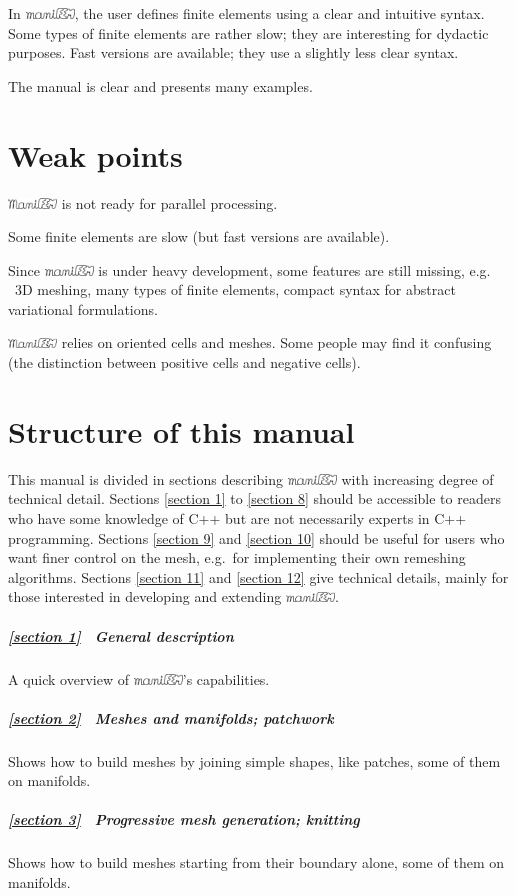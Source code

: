 \documentclass[a4paper]{scrreprt}
\def\numb{}
\newcommand\ManiFEM{\leavevmode\hbox{\includegraphics[width=13mm]{manifem-large}}}
\newcommand\maniFEM{\leavevmode\hbox{\includegraphics[width=13mm]{manifem-small}}}
\renewcommand\tt{\normalfont\ttfamily}
\begin{document}
In {\maniFEM}, the user defines finite elements using a clear and intuitive syntax.
Some types of finite elements are rather slow; they are interesting for dydactic purposes.
Fast versions are available; they use a slightly less clear syntax.

The manual is clear and presents many examples.


\section*{Weak points}

{\ManiFEM} is not ready for parallel processing.

Some finite elements are slow (but fast versions are available).

Since {\maniFEM} is under heavy development, some features are still missing, e.g.%
\ 3D meshing, many types of finite elements, compact syntax for abstract variational
formulations.

{\ManiFEM} relies on oriented cells and meshes.
Some people may find it confusing (the distinction between positive cells and negative cells).


\section*{Structure of this manual}

This manual is divided in sections describing {\maniFEM} with increasing degree of technical
detail.
Sections \ref{\numb section 1} to \ref{\numb section 8} should be accessible to readers
who have some knowledge of {\tt C++} but are not necessarily experts in {\tt C++} programming.
Sections \ref{\numb section 9} and \ref{\numb section 10} should be useful for users
who want finer control on the mesh, e.g.\ for implementing their own remeshing algorithms.
Sections \ref{\numb section 11} and \ref{\numb section 12} give technical details,
mainly for those interested in developing and extending \maniFEM.

\subparagraph*{\ref{\numb section 1} \ General description}
A quick overview of \maniFEM's capabilities.

\subparagraph*{\ref{\numb section 2} \ Meshes and manifolds; patchwork}
Shows how to build meshes by joining simple shapes, like patches, some of them on manifolds.

\subparagraph*{\ref{\numb section 3} \ Progressive mesh generation; knitting}
Shows how to build meshes starting from their boundary alone, some of them on manifolds.
\end{document}
